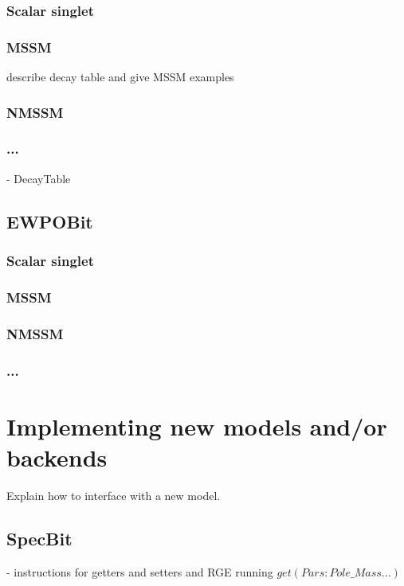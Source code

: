 \documentclass[11pt,a4paper]{article}
\begin{document}
\subsubsection{Scalar singlet}

\subsubsection{MSSM}

describe decay table and give MSSM examples

\subsubsection{NMSSM}
\subsubsection{...}

- DecayTable

\subsection{EWPOBit}
\subsubsection{Scalar singlet}
\subsubsection{MSSM}
\subsubsection{NMSSM}
\subsubsection{...}
 

\section{Implementing new models and/or backends}

Explain how to interface with a new model.

\subsection{SpecBit}

- instructions for getters and setters and RGE running
$get(Pars:Pole\_Mass...)$
\end{document}
